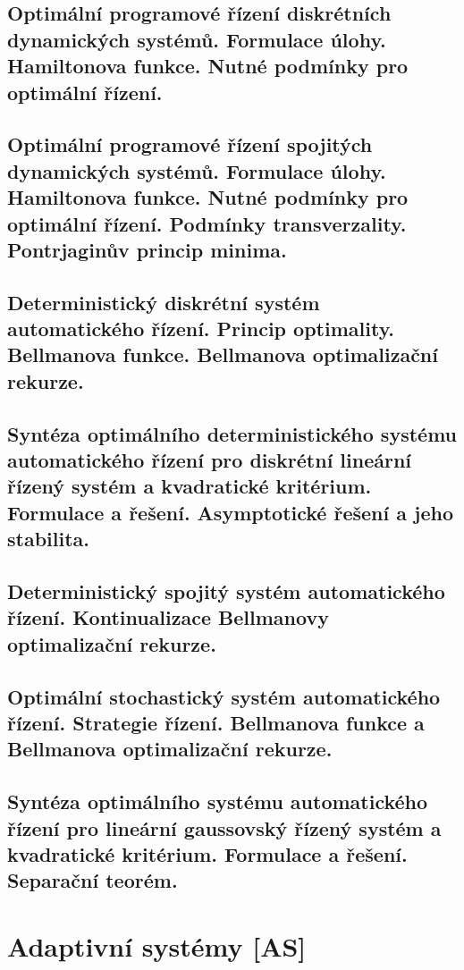 \subsection{Optimální programové řízení diskrétních dynamických systémů. Formulace úlohy. Hamiltonova funkce. Nutné podmínky pro optimální řízení.}

\subsection{Optimální programové řízení spojitých dynamických systémů. Formulace úlohy. Hamiltonova funkce. Nutné podmínky pro optimální řízení. Podmínky transverzality. Pontrjaginův princip minima.}

\subsection{Deterministický diskrétní systém automatického řízení. Princip optimality. Bellmanova funkce. Bellmanova optimalizační rekurze.}

\subsection{Syntéza optimálního deterministického systému automatického řízení pro diskrétní lineární řízený systém a kvadratické kritérium. Formulace a řešení. Asymptotické řešení a jeho stabilita.}

\subsection{Deterministický spojitý systém automatického řízení. Kontinualizace Bellmanovy optimalizační rekurze.}

\subsection{Optimální stochastický systém automatického řízení. Strategie řízení. Bellmanova funkce a Bellmanova optimalizační rekurze.}

\subsection{Syntéza optimálního systému automatického řízení pro lineární gaussovský řízený systém a kvadratické kritérium. Formulace a řešení. Separační teorém.}

\section{Adaptivní systémy [AS]}

